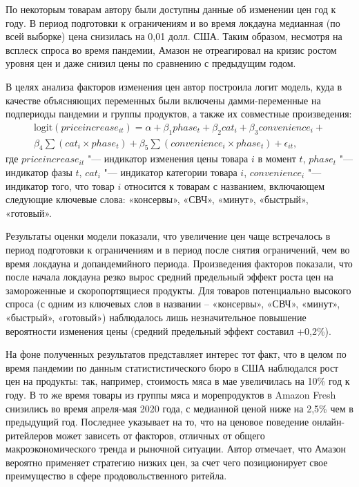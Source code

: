 По некоторым товарам автору были доступны данные об изменении цен год к году. В период подготовки к ограничениям и во время локдауна медианная (по всей выборке) цена снизилась на 0,01 долл. США. Таким образом, несмотря на всплеск спроса во время пандемии, Амазон не отреагировал на кризис ростом уровня цен и даже снизил цены по сравнению с предыдущим годом.

В целях анализа факторов изменения цен автор построила логит модель, куда в качестве объясняющих переменных были включены дамми-переменные на подпериоды пандемии и группы продуктов, а также их совместные произведения:
\begin{multline}
	\label{eq:equation4}
	\text{logit}(priceincrease_{it}) = \alpha + \beta_1 phase_t + \beta_2 cat_i + \beta_3 convenience_i + \\
	\beta_4 \sum (cat_i \times phase_t) + \beta_5 \sum (convenience_i \times phase_t) + \epsilon_{it},
\end{multline}
где \( priceincrease_{it} \) "--- индикатор изменения цены товара $i$ в момент $t$, \( phase_t \) "--- индикатор фазы $t$, \( cat_i \) "--- индикатор категории товара $i$, \( convenience_i \) "--- индикатор того, что товар $i$ относится к товарам с названием, включающем следующие ключевые слова: «консервы», «СВЧ», «минут», «быстрый», «готовый».

Результаты оценки модели показали, что увеличение цен чаще встречалось в период подготовки к ограничениям и в период после снятия ограничений, чем во время локдауна и допандемийного периода. Произведения факторов показали, что после начала локдауна резко вырос средний предельный эффект роста цен на замороженные и скоропортящиеся продукты. Для товаров потенциально высокого спроса (с одним из ключевых слов в названии – «консервы», «СВЧ», «минут», «быстрый», «готовый») наблюдалось лишь незначительное повышение вероятности изменения цены (средний предельный эффект составил +0,2\%).

На фоне полученных результатов представляет интерес тот факт, что в целом по время пандемии по данным статистистического бюро в США наблюдался рост цен на продукты: так, например, стоимость мяса в мае увеличилась на 10\% год к году. В то же время товары из группы мяса и морепродуктов в Amazon Fresh снизились во время апреля-мая 2020 года, с медианной ценой ниже на 2,5\% чем в предыдущий год. Последнее указывает на то, что на ценовое поведение онлайн-ритейлеров может зависеть от факторов, отличных от общего макроэкономического тренда и рыночной ситуации. Автор отмечает, что Амазон вероятно применяет стратегию низких цен, за счет чего позиционирует свое преимущество в сфере продовольственного ритейла.


